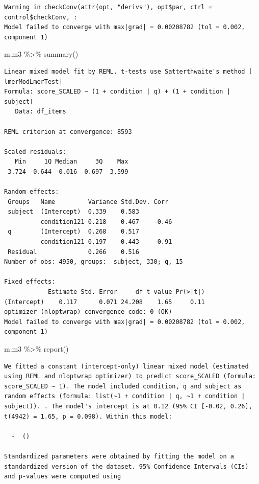 \documentclass[
  letterpaper,
  DIV=11,
  numbers=noendperiod]{scrreprt}
\newenvironment{Shaded}{\begin{snugshade}}{\end{snugshade}}
\newcommand{\FunctionTok}[1]{\textcolor[rgb]{0.28,0.35,0.67}{#1}}
\newcommand{\NormalTok}[1]{\textcolor[rgb]{0.00,0.23,0.31}{#1}}
\newcommand{\SpecialCharTok}[1]{\textcolor[rgb]{0.37,0.37,0.37}{#1}}
\begin{document}
\begin{verbatim}
Warning in checkConv(attr(opt, "derivs"), opt$par, ctrl = control$checkConv, :
Model failed to converge with max|grad| = 0.00208782 (tol = 0.002, component 1)
\end{verbatim}

\begin{Shaded}
\begin{Highlighting}[]
\NormalTok{m.m3 }\SpecialCharTok{\%\textgreater{}\%} \FunctionTok{summary}\NormalTok{() }
\end{Highlighting}
\end{Shaded}

\begin{verbatim}
Linear mixed model fit by REML. t-tests use Satterthwaite's method [
lmerModLmerTest]
Formula: score_SCALED ~ (1 + condition | q) + (1 + condition | subject)
   Data: df_items

REML criterion at convergence: 8593

Scaled residuals: 
   Min     1Q Median     3Q    Max 
-3.724 -0.644 -0.016  0.697  3.599 

Random effects:
 Groups   Name         Variance Std.Dev. Corr 
 subject  (Intercept)  0.339    0.583         
          condition121 0.218    0.467    -0.46
 q        (Intercept)  0.268    0.517         
          condition121 0.197    0.443    -0.91
 Residual              0.266    0.516         
Number of obs: 4950, groups:  subject, 330; q, 15

Fixed effects:
            Estimate Std. Error     df t value Pr(>|t|)
(Intercept)    0.117      0.071 24.208    1.65     0.11
optimizer (nloptwrap) convergence code: 0 (OK)
Model failed to converge with max|grad| = 0.00208782 (tol = 0.002, component 1)
\end{verbatim}

\begin{Shaded}
\begin{Highlighting}[]
\NormalTok{m.m3 }\SpecialCharTok{\%\textgreater{}\%} \FunctionTok{report}\NormalTok{()}
\end{Highlighting}
\end{Shaded}

\begin{verbatim}
We fitted a constant (intercept-only) linear mixed model (estimated using REML and nloptwrap optimizer) to predict score_SCALED (formula: score_SCALED ~ 1). The model included condition, q and subject as random effects (formula: list(~1 + condition | q, ~1 + condition | subject)). . The model's intercept is at 0.12 (95% CI [-0.02, 0.26], t(4942) = 1.65, p = 0.098). Within this model:

  -  ()

Standardized parameters were obtained by fitting the model on a standardized version of the dataset. 95% Confidence Intervals (CIs) and p-values were computed using 
\end{verbatim}
\end{document}
